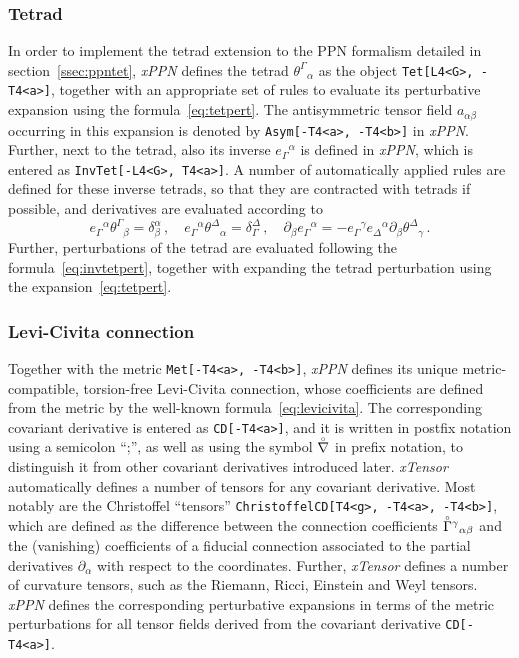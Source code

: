 \documentclass[notitlepage,a4paper,aps,prd,onecolumn,superscriptaddress,nofootinbib,groupedaddress,longbibliography]{revtex4-1}
\newcommand{\lc}[1]{\accentset{\circ}{#1}}
\newcommand{\xPPN}{\emph{xPPN}}
\newcommand{\xTensor}{\emph{xTensor}}
\begin{document}
\subsubsection{Tetrad}\label{sssec:tetrad}
In order to implement the tetrad extension to the PPN formalism detailed in section~\ref{ssec:ppntet}, \xPPN{} defines the tetrad \(\theta^{\Gamma}{}_{\alpha}\) as the object \lstinline/Tet[L4<G>, -T4<a>]/, together with an appropriate set of rules to evaluate its perturbative expansion using the formula~\eqref{eq:tetpert}. The antisymmetric tensor field \(a_{\alpha\beta}\) occurring in this expansion is denoted by \lstinline/Asym[-T4<a>, -T4<b>]/ in \xPPN. Further, next to the tetrad, also its inverse \(e_{\Gamma}{}^{\alpha}\) is defined in \xPPN, which is entered as \lstinline/InvTet[-L4<G>, T4<a>]/. A number of automatically applied rules are defined for these inverse tetrads, so that they are contracted with tetrads if possible, and derivatives are evaluated according to
\begin{equation}
e_{\Gamma}{}^{\alpha}\theta^{\Gamma}{}_{\beta} = \delta^{\alpha}_{\beta}\,, \quad
e_{\Gamma}{}^{\alpha}\theta^{\Delta}{}_{\alpha} = \delta_{\Gamma}^{\Delta}\,, \quad
\partial_{\beta}e_{\Gamma}{}^{\alpha} = -e_{\Gamma}{}^{\gamma}e_{\Delta}{}^{\alpha}\partial_{\beta}\theta^{\Delta}{}_{\gamma}\,.
\end{equation}
Further, perturbations of the tetrad are evaluated following the formula~\eqref{eq:invtetpert}, together with expanding the tetrad perturbation using the expansion~\eqref{eq:tetpert}.

\subsubsection{Levi-Civita connection}\label{sssec:levicivita}
Together with the metric \lstinline/Met[-T4<a>, -T4<b>]/, \xPPN{} defines its unique metric-compatible, torsion-free Levi-Civita connection, whose coefficients are defined from the metric by the well-known formula~\eqref{eq:levicivita}. The corresponding covariant derivative is entered as \lstinline/CD[-T4<a>]/, and it is written in postfix notation using a semicolon ``;'', as well as using the symbol \(\lc{\nabla}\) in prefix notation, to distinguish it from other covariant derivatives introduced later. \xTensor{} automatically defines a number of tensors for any covariant derivative. Most notably are the Christoffel ``tensors'' \lstinline/ChristoffelCD[T4<g>, -T4<a>, -T4<b>]/, which are defined as the difference between the connection coefficients \(\lc{\Gamma}^{\gamma}{}_{\alpha\beta}\) and the (vanishing) coefficients of a fiducial connection associated to the partial derivatives \(\partial_{\alpha}\) with respect to the coordinates. Further, \xTensor{} defines a number of curvature tensors, such as the Riemann, Ricci, Einstein and Weyl tensors. \xPPN{} defines the corresponding perturbative expansions in terms of the metric perturbations for all tensor fields derived from the covariant derivative \lstinline/CD[-T4<a>]/.
\end{document}
